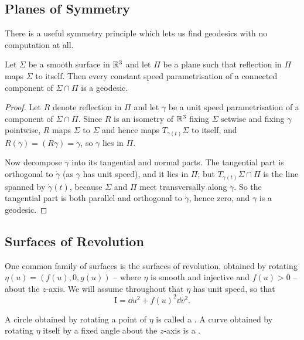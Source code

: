 \documentclass[a4paper]{scrartcl}
\begin{document}
\subsection{Planes of Symmetry}

There is a useful symmetry principle which lets us find geodesics with no computation at all.

\begin{proposition}
    Let $\Sigma$ be a smooth surface in $\mathbb{R}^3$ and let $\Pi$ be a plane such that reflection in $\Pi$ maps $\Sigma$ to itself. Then every constant speed parametrisation of a connected component of $\Sigma \cap \Pi$ is a geodesic.
\end{proposition}
\begin{proof}
    Let $R$ denote reflection in $\Pi$ and let $\gamma$ be a unit speed parametrisation of a component of $\Sigma\cap\Pi$. Since $R$ is an isometry of $\mathbb{R}^3$ fixing $\Sigma$ setwise and fixing $\gamma$ pointwise, $R$ maps $\Sigma$ to $\Sigma$ and hence maps $T_{\gamma(t)}\Sigma$ to itself, and $R(\ddot\gamma) = \ddot{(R\gamma)} = \ddot\gamma$, so $\ddot\gamma$ lies in $\Pi$.

    Now decompose $\ddot\gamma$ into its tangential and normal parts. The tangential part is orthogonal to $\dot\gamma$ (as $\gamma$ has unit speed), and it lies in $\Pi$; but $T_{\gamma(t)}\Sigma \cap \Pi$ is the line spanned by $\dot\gamma(t)$, because $\Sigma$ and $\Pi$ meet transversally along $\gamma$. So the tangential part is both parallel and orthogonal to $\dot\gamma$, hence zero, and $\gamma$ is a geodesic.
\end{proof}

\subsection{Surfaces of Revolution}

One common family of surfaces is the surfaces of revolution, obtained by rotating $\eta(u) = (f(u), 0, g(u))$ -- where $\eta$ is smooth and injective and $f(u) > 0$ -- about the $z$-axis. We will assume throughout that $\eta$ has unit speed, so that
$$
\mathrm{I} = \dd u^2 + f(u)^2 \dd v^2.
$$

\begin{definition}
A circle obtained by rotating a point of $\eta$ is called a . A curve obtained by rotating $\eta$ itself by a fixed angle about the $z$-axis is a .
\end{definition}
\end{document}
